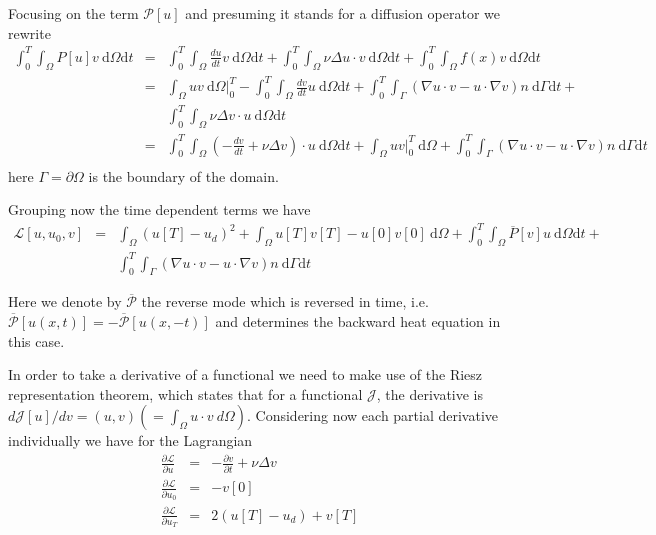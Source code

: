 \documentclass[10pt]{article}
\renewcommand{\d}{\mathrm{d}}
\begin{document}
Focusing on the term $\mathcal P[u]$ and presuming it stands for a diffusion operator we rewrite
\begin{eqnarray}
\int_0^T\int_{\Omega} P[u]  v \ \d \Omega \d t &=&
\int_0^T\int_{\Omega} \frac{d u}{d t}  v \ \d \Omega \d t+ \int_0^T\int_{\Omega} \nu\Delta  u \cdot  v \ \d \Omega \d t+\int_0^T\int_{\Omega}  f( x)   v \ \d \Omega \d t \\ \nonumber
&=& \int_{\Omega} u v \ \d \Omega|_0^T -
\int_0^T\int_{\Omega}
 \frac{d v}{d t}  u \ \d \Omega \d t+ \int_0^T\int_{\Gamma}(\nabla  u\cdot  v-  u\cdot \nabla v) n\ \d \Gamma \d t + \\ \nonumber
 && \int_0^T\int_{\Omega} \nu\Delta  v\cdot   u \ \d \Omega \d t \\ \nonumber
 &=& 
\int_0^T\int_{\Omega}
(- \frac{d v}{d t}  +\nu\Delta  v)\cdot   u\ \d \Omega \d t+\int_{\Omega} u v |_0^T \ \d \Omega
+ \int_0^T\int_{\Gamma}(\nabla  u\cdot  v-  u\cdot \nabla v) n\ \d \Gamma \d t \\ \nonumber
\end{eqnarray}
here $\Gamma=\partial \Omega$ is the boundary of the domain.

Grouping now the time dependent terms we have
\begin{eqnarray}
\mathcal{L}[ u, u_0,v]&=&\int_{\Omega}( u[T]- u_d)^2 + \int_{\Omega} u[T] v[T] - u[0] v[0]\ \d \Omega+\int_0^T\int_{\Omega} \overline{P}[ v]  u \ \d \Omega \d t + \\ \nonumber
 && \int_0^T\int_{\Gamma}(\nabla  u\cdot  v-  u\cdot \nabla v) n\ \d \Gamma \d t
\end{eqnarray}

Here we denote by $\overline{\mathcal P}$ the reverse mode which is reversed in time, i.e. $\overline{\mathcal P}[u(x,t)]=-\overline{\mathcal P}[u(x,-t)]$ and determines the backward heat equation in this case. 

In order to take a derivative of a functional we need to make use of the Riesz representation theorem, which states that for a functional $\mathcal J$, the derivative is $d \mathcal J[u]/dv=(u,v)(=\int_{\Omega} u\cdot v \ d \Omega)$. Considering now each partial derivative individually we have for the Lagrangian
\begin{eqnarray}
\frac{\partial \mathcal L}{\partial  u}&=&- \frac{\partial v}{\partial t}  +\nu\Delta  v \\ \nonumber
\frac{\partial \mathcal L}{\partial  u_0}&=&- v[0]\\ \nonumber
\frac{\partial \mathcal L}{\partial  u_T}&=&2( u[T]- u_d)+ v[T]\\ \nonumber
\end{eqnarray}
\end{document}

